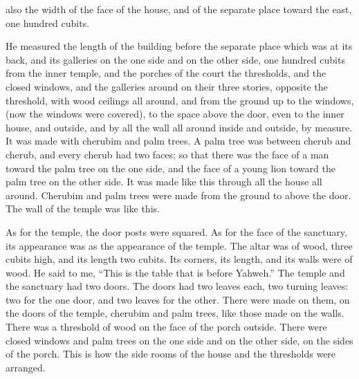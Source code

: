 {also the width of the face of the house, and of the separate place toward the east, one hundred cubits.
\par }{\PP {}He measured the length of the building before the separate place which was at its back, and its galleries on the one side and on the other side, one hundred cubits from the inner temple, and the porches of the court
the thresholds, and the closed windows, and the galleries around on their three stories, opposite the threshold, with wood ceilings all around, and from the ground up to the windows, (now the windows were covered),
to the space above the door, even to the inner house, and outside, and by all the wall all around inside and outside, by measure.
It was made with cherubim and palm trees. A palm tree was between cherub and cherub, and every cherub had two faces;
so that there was the face of a man toward the palm tree on the one side, and the face of a young lion toward the palm tree on the other side. It was made like this through all the house all around.
Cherubim and palm trees were made from the ground to above the door. The wall of the temple was like this.
\par }{\PP {}As for the temple, the door posts were squared. As for the face of the sanctuary, its appearance was as the appearance of the temple.
The altar was of wood, three cubits high, and its length two cubits. Its corners, its length, and its walls were of wood. He said to me, “This is the table that is before Yahweh.”
The temple and the sanctuary had two doors.
The doors had two leaves each, two turning leaves: two for the one door, and two leaves for the other.
There were made on them, on the doors of the temple, cherubim and palm trees, like those made on the walls. There was a threshold of wood on the face of the porch outside.
There were closed windows and palm trees on the one side and on the other side, on the sides of the porch. This is how the side rooms of the house and the thresholds were arranged.

}
